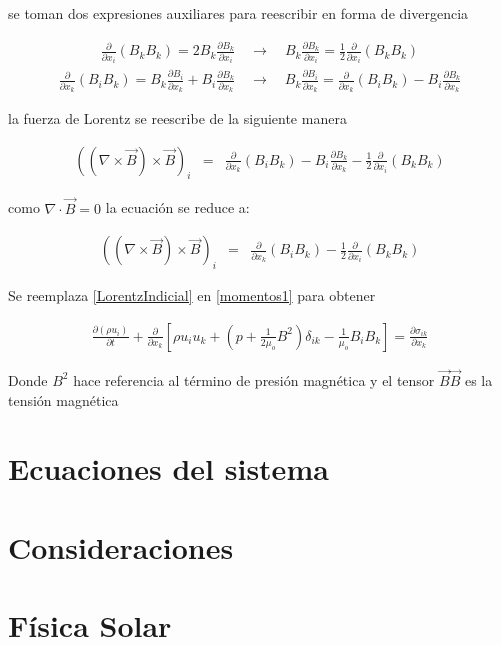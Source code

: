 \noindent se toman dos expresiones auxiliares para reescribir en forma de divergencia


    \begin{eqnarray}
    \frac{\partial}{\partial x_{i}}(B_{k}B_{k}) = 2B_{k}\frac{\partial B_{k}}{\partial x_{i}}\quad\longrightarrow\quad \boxed{B_{k}\frac{\partial B_{k}}{\partial x_{i}} = \frac{1}{2}\frac{\partial}{\partial x_{i}}(B_{k}B_{k})}
    \end{eqnarray}
    \begin{eqnarray}
    \frac{\partial}{\partial x_{k}}(B_{i}B_{k}) = B_{k}\frac{\partial B_{i}}{\partial x_{k}} + B_{i}\frac{\partial B_{k}}{\partial x_{k}} \quad\longrightarrow\quad \boxed{B_{k}\frac{\partial B_{i}}{\partial x_{k}}=\frac{\partial}{\partial x_{k}}(B_{i}B_{k})-B_{i}\frac{\partial B_{k}}{\partial x_{k}}}
    \end{eqnarray}

\noindent la fuerza de Lorentz se reescribe de la siguiente manera

\begin{eqnarray}
\left((\nabla\times\vec{B})\times\vec{B}\right)_{i} &=& \frac{\partial}{\partial x_{k}}(B_{i}B_{k})-B_{i}\frac{\partial B_{k}}{\partial x_{k}}-\frac{1}{2}\frac{\partial}{\partial x_{i}}(B_{k}B_{k})\nonumber 
\end{eqnarray}

\noindent como $\nabla\cdot\vec{B} = 0$ la ecuación se reduce a:

\begin{eqnarray}
\label{LorentzIndicial}
\left((\nabla\times\vec{B})\times\vec{B}\right)_{i} &=& \frac{\partial}{\partial x_{k}}(B_{i}B_{k})-\frac{1}{2}\frac{\partial}{\partial x_{i}}(B_{k}B_{k}) 
\end{eqnarray}

Se reemplaza \eqref{LorentzIndicial} en \eqref{momentos1} para obtener

\begin{eqnarray}
\boxed{\frac{\partial(\rho u_{i})}{\partial t}+\frac{\partial}{\partial x_{k}}\left[\rho u_{i}u_{k}+\left(p+\frac{1}{2\mu_{o}}B^{2}\right)\delta_{ik}-\frac{1}{\mu_{o}}B_{i}B_{k}\right] = \frac{\partial \sigma_{ik}}{\partial x_{k}}}
\end{eqnarray}

Donde $B^{2}$ hace referencia al término de presión magnética y el tensor $\vec{B}\vec{B}$ es la tensión magnética

\section{Ecuaciones del sistema}
\section{Consideraciones}
\section{Física Solar }
